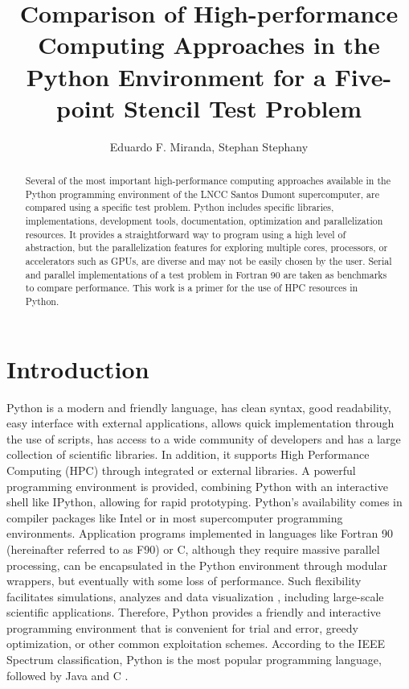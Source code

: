 \documentclass[12pt]{article}
\title{Comparison of High-performance Computing Approaches in the Python Environment for a Five-point Stencil Test Problem}
\author{Eduardo F. Miranda\inst{1}, Stephan Stephany\inst{1}}
\begin{document}
 

\maketitle

\begin{abstract}
Several of the most important high-performance computing approaches available in the Python programming environment of the LNCC Santos Dumont supercomputer, are compared using a specific test problem. Python includes specific libraries, implementations, development tools, documentation, optimization and parallelization resources. It provides a straightforward way to program using a high level of abstraction, but the parallelization features for exploring multiple cores, processors, or accelerators such as GPUs, are diverse and may not be easily chosen by the user. Serial and parallel implementations of a test problem in Fortran 90 are taken as benchmarks to compare performance. This work is a primer for the use of HPC resources in Python.
\end{abstract}










\section{Introduction}
\label{sec:introduction}

Python is a modern and friendly language, has clean syntax, good readability, easy interface with external applications, allows quick implementation through the use of scripts, has access to a wide community of developers and has a large collection of scientific libraries. In addition, it supports High Performance Computing (HPC) through integrated or external libraries. A powerful programming environment is provided, combining Python with an interactive shell like IPython, allowing for rapid prototyping. Python's availability comes in compiler packages like Intel or in most supercomputer programming environments. Application programs implemented in languages like Fortran 90 (hereinafter referred to as F90) or C, although they require massive parallel processing, can be encapsulated in the Python environment through modular wrappers, but eventually with some loss of performance. Such flexibility facilitates simulations, analyzes and data visualization \cite{Beazley1997}, including large-scale scientific applications. Therefore, Python provides a friendly and interactive programming environment that is convenient for trial and error, greedy optimization, or other common exploitation schemes. According to the IEEE Spectrum classification, Python is the most popular programming language, followed by Java and C \cite{IEEE}.
\end{document}
